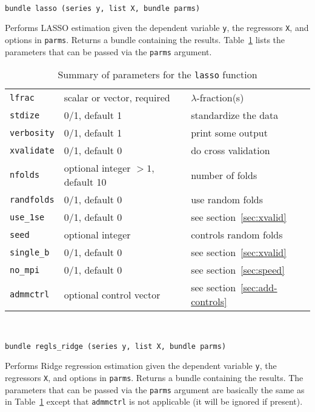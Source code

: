 \documentclass{article}
\newenvironment{funcdoc}
{\noindent\hrulefill\\[-12pt]}
{\medbreak}
\begin{document}
\begin{funcdoc}
\begin{verbatim}
bundle lasso (series y, list X, bundle parms)
\end{verbatim}
  Performs LASSO estimation given the dependent variable \texttt{y},
  the regressors \texttt{X}, and options in \texttt{parms}. Returns a
  bundle containing the results. Table~\ref{tab:lasso-parms} lists the
  parameters that can be passed via the \texttt{parms} argument.
\end{funcdoc}

\begin{table}[htbp]
  \centering
  \begin{tabular}{lll}
    \texttt{lfrac} & scalar or vector, required &
                                                  $\lambda$-fraction(s) \\
    \texttt{stdize} & 0/1, default 1 & standardize the data \\
    \texttt{verbosity} & 0/1, default 1 & print some output\\
    \texttt{xvalidate} & 0/1, default 0 & do cross validation\\
    \texttt{nfolds} & optional integer $>1$, default 10 & number of
                                                          folds \\
    \texttt{randfolds} & 0/1, default 0 & use random folds\\
    \texttt{use\_1se} & 0/1, default 0 & see section~\ref{sec:xvalid} \\
    \texttt{seed} & optional integer & controls random folds\\
    \texttt{single\_b} & 0/1, default 0 & see section~\ref{sec:xvalid}\\
    \texttt{no\_mpi} & 0/1, default 0 & see section~\ref{sec:speed}\\
    \texttt{admmctrl} & optional control vector & see section~\ref{sec:add-controls} \\
  \end{tabular}
  \caption{Summary of parameters for the \texttt{lasso} function}
  \label{tab:lasso-parms}
\end{table}

\begin{funcdoc}
\begin{verbatim}
bundle regls_ridge (series y, list X, bundle parms)
\end{verbatim}
  Performs Ridge regression estimation given the dependent variable
  \texttt{y}, the regressors \texttt{X}, and options in
  \texttt{parms}. Returns a bundle containing the results. The
  parameters that can be passed via the \texttt{parms} argument are
  basically the same as in Table~\ref{tab:lasso-parms} except that
  \texttt{admmctrl} is not applicable (it will be ignored if present).
\end{funcdoc}
\end{document}
